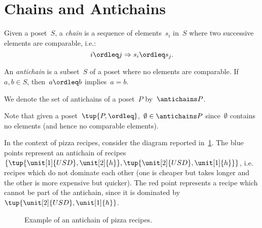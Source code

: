 

\section{Chains and Antichains}\label{sec:chains-antichains}

\begin{definition}
    \label{def:chain}
    Given a poset~$S$, a \emph{chain} is a sequence of elements~${s_i}$ in~$S$ where two successive elements are comparable, i.e.:
    \begin{equation}
        i \ordleq j \Rightarrow s_i \ordleq s_j.
    \end{equation}
\end{definition}

\begin{definition}
    \label{def:antichain}
    An \emph{antichain} is a subset~$S$ of a poset where no elements are comparable. If~$a,b \in S$, then~$a \ordleq b$ implies~$a=b$.
\end{definition}
\begin{remark}
    We denote the set of antichains of a poset~$P$ by~$\antichains P$.
\end{remark}
\begin{remark}
    Note that given a poset~$\tup{P,\ordleq}$,~$\emptyset \in \antichains P$ since~$\emptyset$ contains no elements (and hence no comparable elements).
\end{remark}

In the context of pizza recipes, consider the diagram reported in~\cref{fig:antichain}. The blue points represent an antichain of recipes~$\{\tup{\unit[1]{USD},\unit[2]{h}},\tup{\unit[2]{USD},\unit[1]{h}}\}$, i.e. recipes which do not dominate each other (one is cheaper but takes longer and the other is more expensive but quicker). The red point represents a recipe which cannot be part of the antichain, since it is dominated by~$\tup{\unit[2]{USD},\unit[1]{h}}$.

\begin{figure}[h!]
    \begin{center}
    \end{center}
    \caption{Example of an antichain of pizza recipes. \label{fig:antichain}}
\end{figure}


